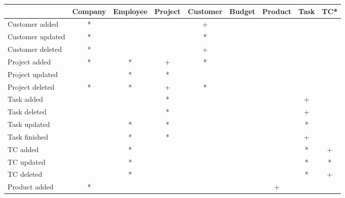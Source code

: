 \hspace*{-2,5cm}
\begin{tabular}{|l||c|c|c|c|c|c|c|c|}
  \hline
                                   & Company & Employee & Project & Customer & Budget  & Product & Task    & TC*             \\\hline \hline
   Customer added                  &    *    &          &         &     +    &         &         &         &                 \\\hline
   Customer updated                &    *    &          &         &     *    &         &         &         &                 \\\hline 
   Customer deleted                &    *    &          &         &     +    &         &         &         &                 \\\hline
   Project added                   &    *    &    *     &    +    &     *    &         &         &         &                 \\\hline
   Project updated                 &         &    *     &    *    &          &         &         &         &                 \\\hline
   Project deleted                 &    *    &    *     &    +    &     *    &         &         &         &                 \\\hline
   Task added                      &         &          &    *    &          &         &         &   +     &                 \\\hline 
   Task deleted                    &         &          &    *    &          &         &         &   +     &                 \\\hline
   Task updated                    &         &    *     &    *    &          &         &         &   *     &                 \\\hline
   Task finished                   &         &    *     &    *    &          &         &         &   +     &                 \\\hline
   TC added                        &         &    *     &         &          &         &         &   *     &   +             \\\hline
   TC updated                      &         &    *     &         &          &         &         &   *     &   *             \\\hline
   TC deleted                      &         &    *     &         &          &         &         &   *     &   +             \\\hline
   Product added                   &    *    &          &         &          &         &    +    &         &                 \\\hline

\end{tabular}

